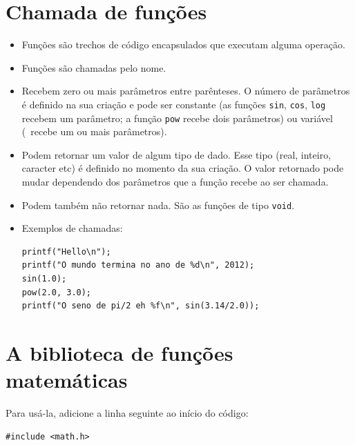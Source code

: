 \section{Chamada de funções}

\begin{itemize}

\item Funções são trechos de código encapsulados que executam alguma operação.
\item Funções são chamadas pelo nome.
\item Recebem zero ou mais parâmetros entre parênteses. O número de parâmetros é definido na sua criação e pode ser constante 
(as funções {\tt sin}, {\tt cos}, {\tt log} recebem um parâmetro; 
a função {\tt pow} recebe dois parâmetros)
ou variável (\PRINTF\ recebe um ou mais parâmetros).
\item Podem retornar um valor de algum tipo de dado. Esse tipo (real, inteiro, caracter etc) é definido no momento da sua criação. O valor retornado pode mudar dependendo dos parâmetros que a função recebe ao ser chamada.
\item Podem também não retornar nada. São as funções de tipo {\tt void}.

\item Exemplos de chamadas:

\begin{lstlisting}
printf("Hello\n");
printf("O mundo termina no ano de %d\n", 2012);
sin(1.0);
pow(2.0, 3.0);
printf("O seno de pi/2 eh %f\n", sin(3.14/2.0));
\end{lstlisting}

\end{itemize}


\section{A biblioteca de funções matemáticas}

Para usá-la, adicione a linha seguinte ao início do código:

\begin{lstlisting}
#include <math.h>
\end{lstlisting}

